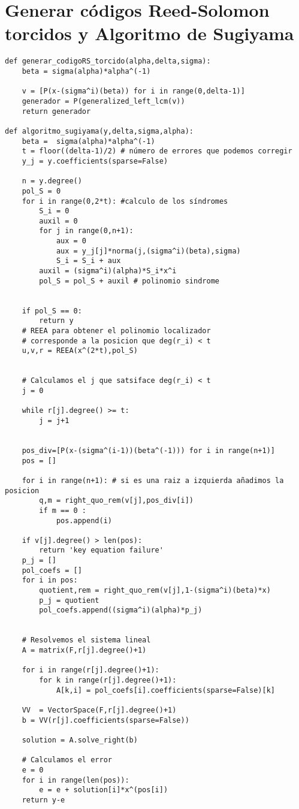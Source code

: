 \section{Generar códigos Reed-Solomon torcidos y Algoritmo de Sugiyama}

\begin{verbatim}
def generar_codigoRS_torcido(alpha,delta,sigma):
    beta = sigma(alpha)*alpha^(-1)

    v = [P(x-(sigma^i)(beta)) for i in range(0,delta-1)] 
    generador = P(generalized_left_lcm(v))
    return generador

def algoritmo_sugiyama(y,delta,sigma,alpha):
    beta =  sigma(alpha)*alpha^(-1)
    t = floor((delta-1)/2) # número de errores que podemos corregir
    y_j = y.coefficients(sparse=False)

    n = y.degree()
    pol_S = 0
    for i in range(0,2*t): #calculo de los síndromes
        S_i = 0
        auxil = 0
        for j in range(0,n+1):
            aux = 0
            aux = y_j[j]*norma(j,(sigma^i)(beta),sigma)
            S_i = S_i + aux
        auxil = (sigma^i)(alpha)*S_i*x^i 
        pol_S = pol_S + auxil # polinomio sindrome

    
    if pol_S == 0:
        return y
    # REEA para obtener el polinomio localizador
    # corresponde a la posicion que deg(r_i) < t
    u,v,r = REEA(x^(2*t),pol_S)
    
    
    # Calculamos el j que satsiface deg(r_i) < t
    j = 0

    while r[j].degree() >= t: 
        j = j+1
    
    
    pos_div=[P(x-(sigma^(i-1))(beta^(-1))) for i in range(n+1)]
    pos = []

    for i in range(n+1): # si es una raiz a izquierda añadimos la posicion
        q,m = right_quo_rem(v[j],pos_div[i])
        if m == 0 :
            pos.append(i)
    
    if v[j].degree() > len(pos):
        return 'key equation failure'
    p_j = []
    pol_coefs = []
    for i in pos:
        quotient,rem = right_quo_rem(v[j],1-(sigma^i)(beta)*x)
        p_j = quotient
        pol_coefs.append((sigma^i)(alpha)*p_j)
    
    
    # Resolvemos el sistema lineal
    A = matrix(F,r[j].degree()+1)

    for i in range(r[j].degree()+1):
        for k in range(r[j].degree()+1):
            A[k,i] = pol_coefs[i].coefficients(sparse=False)[k]

    VV  = VectorSpace(F,r[j].degree()+1)
    b = VV(r[j].coefficients(sparse=False))

    solution = A.solve_right(b)
    
    # Calculamos el error
    e = 0
    for i in range(len(pos)):
        e = e + solution[i]*x^(pos[i])
    return y-e
\end{verbatim}


